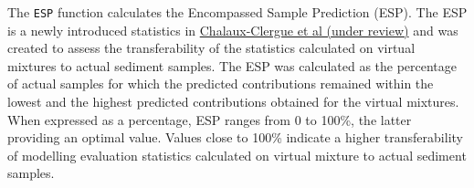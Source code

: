 \documentclass[
]{article}
\newenvironment{Shaded}{\begin{snugshade}}{\end{snugshade}}
\newcommand{\CommentTok}[1]{\textcolor[rgb]{0.56,0.35,0.01}{\textit{#1}}}
\newcommand{\DecValTok}[1]{\textcolor[rgb]{0.00,0.00,0.81}{#1}}
\newcommand{\NormalTok}[1]{#1}
\newcommand{\SpecialCharTok}[1]{\textcolor[rgb]{0.81,0.36,0.00}{\textbf{#1}}}
\begin{document}
\begin{Shaded}
\end{Shaded}

The \texttt{ESP} function calculates the Encompassed Sample Prediction
(ESP). The ESP is a newly introduced statistics in
\href{}{Chalaux-Clergue et al (under review)} and was created to assess
the transferability of the statistics calculated on virtual mixtures to
actual sediment samples. The ESP was calculated as the percentage of
actual samples for which the predicted contributions remained within the
lowest and the highest predicted contributions obtained for the virtual
mixtures. When expressed as a percentage, ESP ranges from 0 to 100\%,
the latter providing an optimal value. Values close to 100\% indicate a
higher transferability of modelling evaluation statistics calculated on
virtual mixture to actual sediment samples.
\end{document}

